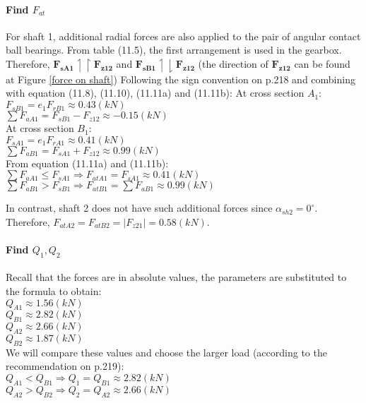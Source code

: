 \paragraph{Find $ F_{at} $} For shaft 1, additional radial forces are also applied to the pair of angular contact ball bearings. From table (11.5), the first arrangement is used in the gearbox. Therefore, $ \mathbf{F_{sA1}} \upharpoonleft\upharpoonright \mathbf{F_{z12}} $ and $ \mathbf{F_{sB1}} \upharpoonleft\downharpoonright \mathbf{F_{z12}} $ (the direction of $ \mathbf{F_{z12}} $ can be found at Figure \ref{force on shaft}) Following the sign convention on p.218 and combining with equation (11.8), (11.10), (11.11a) and (11.11b):
At cross section $ A_1 $:\\
$ F_{sB1} = e_1F_{rB1}  \approx 0.43\unit{(kN)}$\\
$ \displaystyle\sum F_{aA1} = F_{sB1} - F_{z12} \approx -0.15 \unit{(kN)}$\\
At cross section $ B_1 $:\\
$ F_{sA1} = e_1F_{rA1}  \approx 0.41\unit{(kN)}$\\
$ \displaystyle\sum F_{aB1} = F_{sA1} + F_{z12} \approx 0.99 \unit{(kN)}$\\
From equation (11.11a) and (11.11b):\\
$  \displaystyle\sum F_{aA1} \leq F_{sA1} \Rightarrow F_{atA1} = F_{sA1}  \approx  0.41\unit{(kN)} $\\
$ \displaystyle \sum F_{aB1} > F_{sB1} \Rightarrow F_{atB1} = \sum F_{aB1}  \approx  0.99\unit{(kN)} $

In contrast, shaft 2 does not have such additional forces since $ \alpha_{sh2} = 0^\circ $. Therefore, $ F_{atA2} = F_{atB2} = |F_{z21}| = 0.58\unit{(kN)} $.

\paragraph{Find $ Q_1,Q_2 $}
Recall that the forces are in absolute values, the parameters are substituted to the formula to obtain:\\
$ Q_{A1} \approx 1.56 \unit{(kN)} $\\
$ Q_{B1} \approx 2.82 \unit{(kN)} $\\
$ Q_{A2} \approx2.66  \unit{(kN)} $\\
$ Q_{B2} \approx 1.87 \unit{(kN)} $\\
We will compare these values and choose the larger load (according to the recommendation on p.219):\\
$ Q_{A1} < Q_{B1} \Rightarrow Q_1 = Q_{B1}  \approx 2.82 \unit{(kN)}$\\
$ Q_{A2} > Q_{B2} \Rightarrow Q_2 = Q_{A2}  \approx 2.66 \unit{(kN)}$


